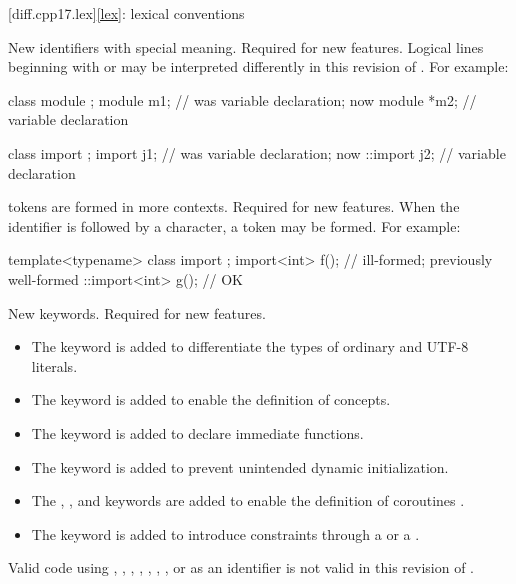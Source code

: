 [diff.cpp17.lex]{\ref{lex}: lexical conventions}

\change
New identifiers with special meaning.
\rationale
Required for new features.
\effect
Logical lines beginning with
 or  may
be interpreted differently
in this revision of \Cpp{}.
For example:
\begin{codeblock}
class module {};
module m1;          // was variable declaration; now 
module *m2;         // variable declaration

class import {};
import j1;          // was variable declaration; now 
::import j2;        // variable declaration
\end{codeblock}

\change
{} tokens are formed in more contexts.
\rationale
Required for new features.
\effect
When the identifier 
is followed by a \tcode{<} character,
a  token may be formed.
For example:
\begin{codeblock}
template<typename> class import {};
import<int> f();                // ill-formed; previously well-formed
::import<int> g();              // OK
\end{codeblock}

\change
New keywords.
\rationale
Required for new features.
\begin{itemize}
\item
{}%
The  keyword is added to differentiate
the types of ordinary and UTF-8 literals.
\item
The  keyword is
added to enable the definition of concepts.
\item
The  keyword is added to
declare immediate functions.
\item
The  keyword is added to
prevent unintended dynamic initialization.
\item
The , , and  keywords are added
to enable the definition of coroutines .
\item
The  keyword is added
to introduce constraints through a 
or a .
\end{itemize}
\effectafteritemize
Valid \CppXVII{} code using
,
,
,
,
, , ,
or 
as an identifier is not valid in this revision of \Cpp{}.

